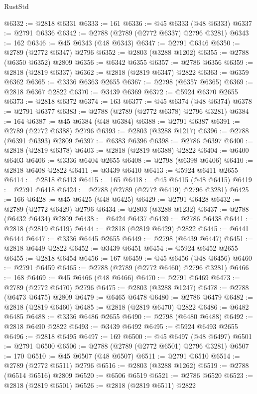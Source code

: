 \begin{lexlean}{RustStd}
\begin{coremodule}
@6332 := @2818 @6331
@6333 := 161
@6336 := @45 @6333 (@48 @6333)
@6337 := @2791 @6336
@6342 := @2788 (@2789 (@2772 @6337) @2796 @3281)
@6343 := 162
@6346 := @45 @6343 (@48 @6343)
@6347 := @2791 @6346
@6350 := @2789 (@2772 @6347) @2796
@6352 := @2803 (@3288 @1202)
@6355 := @2788 (@6350 @6352) @2809
@6356 := @6342 @6355
@6357 := @2786 @6356
@6359 := @2818 (@2819 @6337)
@6362 := @2818 (@2819 @6347) @2822
@6363 := @6359 @6362
@6365 := @3336 @6363 @2655
@6367 := @2798 (@6357 @6365)
@6369 := @2818 @6367 @2822
@6370 := @3439 @6369
@6372 := @5924 @6370 @2655
@6373 := @2818 @6372
@6374 := 163
@6377 := @45 @6374 (@48 @6374)
@6378 := @2791 @6377
@6383 := @2788 (@2789 (@2772 @6378) @2796 @3281)
@6384 := 164
@6387 := @45 @6384 (@48 @6384)
@6388 := @2791 @6387
@6391 := @2789 (@2772 @6388) @2796
@6393 := @2803 (@3288 @1217)
@6396 := @2788 (@6391 @6393) @2809
@6397 := @6383 @6396
@6398 := @2786 @6397
@6400 := @2818 (@2819 @6378)
@6403 := @2818 (@2819 @6388) @2822
@6404 := @6400 @6403
@6406 := @3336 @6404 @2655
@6408 := @2798 (@6398 @6406)
@6410 := @2818 @6408 @2822
@6411 := @3439 @6410
@6413 := @5924 @6411 @2655
@6414 := @2818 @6413
@6415 := 165
@6418 := @45 @6415 (@48 @6415)
@6419 := @2791 @6418
@6424 := @2788 (@2789 (@2772 @6419) @2796 @3281)
@6425 := 166
@6428 := @45 @6425 (@48 @6425)
@6429 := @2791 @6428
@6432 := @2789 (@2772 @6429) @2796
@6434 := @2803 (@3288 @1232)
@6437 := @2788 (@6432 @6434) @2809
@6438 := @6424 @6437
@6439 := @2786 @6438
@6441 := @2818 (@2819 @6419)
@6444 := @2818 (@2819 @6429) @2822
@6445 := @6441 @6444
@6447 := @3336 @6445 @2655
@6449 := @2798 (@6439 @6447)
@6451 := @2818 @6449 @2822
@6452 := @3439 @6451
@6454 := @5924 @6452 @2655
@6455 := @2818 @6454
@6456 := 167
@6459 := @45 @6456 (@48 @6456)
@6460 := @2791 @6459
@6465 := @2788 (@2789 (@2772 @6460) @2796 @3281)
@6466 := 168
@6469 := @45 @6466 (@48 @6466)
@6470 := @2791 @6469
@6473 := @2789 (@2772 @6470) @2796
@6475 := @2803 (@3288 @1247)
@6478 := @2788 (@6473 @6475) @2809
@6479 := @6465 @6478
@6480 := @2786 @6479
@6482 := @2818 (@2819 @6460)
@6485 := @2818 (@2819 @6470) @2822
@6486 := @6482 @6485
@6488 := @3336 @6486 @2655
@6490 := @2798 (@6480 @6488)
@6492 := @2818 @6490 @2822
@6493 := @3439 @6492
@6495 := @5924 @6493 @2655
@6496 := @2818 @6495
@6497 := 169
@6500 := @45 @6497 (@48 @6497)
@6501 := @2791 @6500
@6506 := @2788 (@2789 (@2772 @6501) @2796 @3281)
@6507 := 170
@6510 := @45 @6507 (@48 @6507)
@6511 := @2791 @6510
@6514 := @2789 (@2772 @6511) @2796
@6516 := @2803 (@3288 @1262)
@6519 := @2788 (@6514 @6516) @2809
@6520 := @6506 @6519
@6521 := @2786 @6520
@6523 := @2818 (@2819 @6501)
@6526 := @2818 (@2819 @6511) @2822

\end{coremodule}
\end{lexlean}
